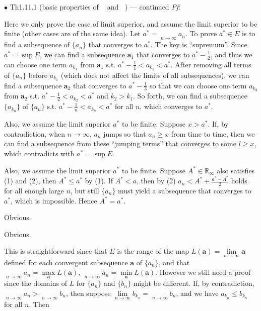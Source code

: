 \documentclass{article}
\begin{document}
\begin{Th}{$\bullet$ Th1.11.1 (basic properties of $\mathop{\overline{\lim}}$ and $\mathop{\underline{\lim}}$) —  continued}
    \textit{Pf}: 
    \begin{compactenum}
        \item Here we only prove the case of limit superior, and assume the limit superior to be finite (other cases are of the same idea). Let $a^\ast = \mathop{\overline{\lim}}\limits_{n\to\infty}a_n$. To prove $a^\ast\in E$ is to find a subsequence of $\{a_n\}$ that converges to $a^\ast$. The key is ``supremum''. Since $a^\ast = \sup E$, we can find a subsequence $\pmb{a}_1$ that converges to $a^\ast-\frac{1}{2}$, and thus we can choose one term $a_{k_1}$ from $\pmb{a}_1$ s.t. $ a^\ast-\frac{1}{1}< a_{k_1} < a^\ast$. After removing all terms of $\{a_n\}$ before $a_{k_1}$ (which does not affect the limits of all subsequences), we can find a subsequence $\pmb{a}_2$ that converges to $a^\ast-\frac{1}{3}$ so that we can choose one term $a_{k_2}$ from $\pmb{a}_2$ s.t. $ a^\ast-\frac{1}{2}< a_{k_2} < a^\ast$ and $k_2>k_1$. So forth, we can find a subsequence $\{a_{k_n}\}$ of $\{a_n\}$ s.t. $a^\ast-\frac{1}{n}< a_{k_n} < a^\ast$ for all $n$, which converges to $a^\ast$.
        \item Also, we assume the limit superior $a^\ast$ to be finite. Suppose $x>a^\ast$. If, by contradiction, when $n\rightarrow\infty$, $a_n$ jumps so that $a_n\geq x$ from time to time, then we can find a subsequence from these ``jumping terms'' that converges to some $l\geq x$, which contradicts with $a^\ast = \sup E$.
        \item Also, we assume the limit superior $a^\ast$ to be finite. Suppose $A^\ast\in\mathbb{R}_\infty$ also satisfies (1) and (2), then $A^\ast\leq a^\ast$ by (1). If $A^\ast<a$, then by (2) $a_n<A^\ast+\frac{a^\ast-A^\ast}{2}$ holds for all enough large $n$, but still $\{a_n\}$ must yield a subsequence that converges to $a^\ast$, which is impossible. Hence $A^\ast = a^\ast$.
        \item Obvious.
        \item Obvious.
        \item This is straightforward since that $E$ is the range of the map $L(\pmb{a}) = \lim\limits_{n\to\infty} \pmb{a}$ defined for each convergent subsequence $\pmb{a}$ of $\{a_n\}$, and that $\mathop{\overline{\lim}}\limits_{n\to\infty} a_n = \max\limits_{\pmb{a}} L(\pmb{a})$, $\mathop{\underline{\lim}}\limits_{n\to\infty} a_n = \min\limits_{\pmb{a}} L(\pmb{a})$. However we still need a proof since the domains of $L$ for $\{a_n\}$ and $\{b_n\}$ might be different. If, by contradiction, $\mathop{\underline{\lim}}\limits_{n\to\infty}a_n > \mathop{\underline{\lim}}\limits_{n\to\infty}b_n$, then suppose $\lim\limits_{n\to\infty}b_{k_n} = \mathop{\underline{\lim}}\limits_{n\to\infty}b_n$, and we have $a_{k_n}\leq b_{k_n}$ for all $n$. Then 

\end{compactenum}
\end{Th}
\end{document}

